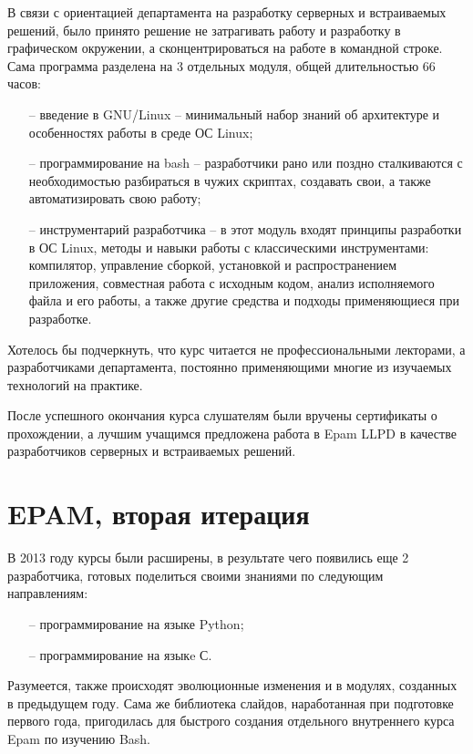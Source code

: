В связи с ориентацией департамента на разработку серверных и встраиваемых решений,  было принято решение не затрагивать работу и разработку в графическом окружении,  а сконцентрироваться на работе в командной строке.
Сама программа разделена на 3 отдельных модуля, общей длительностью 66 часов:

\begin{itemize}
	\item[--] введение в GNU/Linux -- минимальный набор знаний об архитектуре и особенностях работы в среде ОС Linux;
	\item[--] программирование на bash -- разработчики рано или поздно сталкиваются с необходимостью разбираться в 
		чужих скриптах,  создавать свои,  а также автоматизировать свою работу;
	\item[--] инструментарий разработчика -- в этот модуль входят принципы разработки в ОС Linux, методы и навыки работы 
		с классическими инструментами: компилятор, управление сборкой, установкой и распространением приложения,
		совместная работа с исходным кодом, анализ исполняемого файла и его работы,
		а также другие средства и подходы применяющиеся при разработке.
\end{itemize}


Хотелось бы подчеркнуть, что курс читается не профессиональными лекторами, а разработчиками департамента,
постоянно применяющими многие из изучаемых технологий на практике.

После успешного окончания курса слушателям были вручены сертификаты о прохождении, а лучшим учащимся предложена работа 
в Epam LLPD в качестве разработчиков серверных и встраиваемых решений.

\section{EPAM, вторая итерация}

В 2013 году курсы были расширены, в результате чего появились еще 2 разработчика, готовых поделиться своими знаниями по 
следующим направлениям:

\begin{itemize}
	\item[--] программирование на языке Python;
	\item[--] программирование на языкe С.
\end{itemize}

Разумеется, также происходят эволюционные изменения и в модулях, созданных в предыдущем году.
Сама же библиотека слайдов, наработанная при подготовке первого года, пригодилась для быстрого создания отдельного 
внутреннего курса Epam по изучению Bash.

